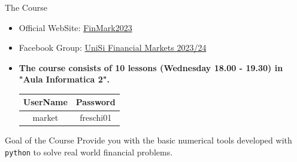 \documentclass{beamer}
\begin{document}
\begin{frame}{The Course}
  \begin{itemize}
  \item Official WebSite: \href{https://sites.google.com/view/finmark2023}{FinMark2023}
  \item Facebook Group: \href{https://www.facebook.com/groups/1484320032353854}{UniSi Financial Markets 2023/24}
  \item \textbf{The course consists of 10 lessons (Wednesday 18.00 - 19.30) in "Aula Informatica 2".}
  \begin{center}
  	\begin{tabular}{|c|c|}
  		\hline
  		UserName & Password \\
  		\hline
  		market & freschi01 \\
  		\hline
  	\end{tabular}
  \end{center}
	\vspace{0.5cm}
\end{itemize}
\begin{block}{Goal of the Course}
  Provide you with the basic numerical tools developed with \texttt{python} to solve real world financial problems.
  \end{block}
  
\end{frame}
\end{document}
